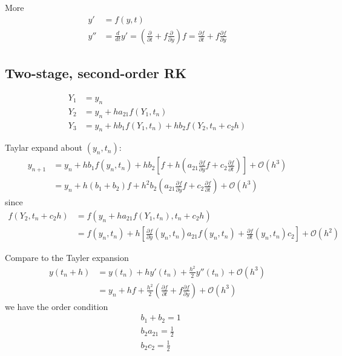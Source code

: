 \documentclass[prd,aps,a4paper,superscriptaddress,onecolumn,footinbib]{revtex4}
\begin{document}
More
\begin{align}
    y'
    &=f(y,t)
    \\
    y''
    &=\frac{d}{dt}y'
    =\left(\frac{\partial}{\partial t}+f\frac{\partial}{\partial y}\right)f
    =\frac{\partial f}{\partial t}+f\frac{\partial f}{\partial y}
\end{align}

\subsection{Two-stage, second-order RK}

\begin{align}
    Y_1&=y_n \\
    Y_2&=y_n+h a_{21}f(Y_1, t_n) \\
    Y_3&=y_n+h b_1f(Y_1, t_n)+h b_2f(Y_2, t_n+c_2h)
\end{align}

Taylar expand about $(y_n, t_n)$:
\begin{align}
    y_{n+1}
    &=y_n + h b_1 f(y_n, t_n) + h b_2
    \left[
        f + h
        \left(
            a_{21} \frac{\partial f}{\partial y} f + c_2\frac{\partial f}{\partial t}
        \right)
    \right]
    + \mathcal{O}(h^3)
    \\
    &=y_n + h(b_1+b_2)f + h^2 b_2
    \left(a_{21}\frac{\partial f}{\partial y}f + c_2\frac{\partial f}{\partial t}\right)
    + \mathcal{O}(h^3)
\end{align}
since
\begin{align}
    f(Y_2, t_n+c_2h)
    &=f(y_n+h a_{21}f(Y_1, t_n), t_n+c_2h) \\
    &=f(y_n, t_n) + h
    \left[
        \frac{\partial f}{\partial y}(y_n, t_n) a_{21}f(y_n, t_n)
        +\frac{\partial f}{\partial t}(y_n, t_n) c_2
    \right]
    + \mathcal{O}(h^2)
\end{align}

Compare to the Tayler expansion
\begin{align}
    y(t_n+h)
    &=y(t_n) + hy'(t_n) + \frac{h^2}{2}y''(t_n)
    + \mathcal{O}(h^3)
    \\
    &=y_n + h f + \frac{h^2}{2} \left(\frac{\partial f}{\partial t}+f\frac{\partial f}{\partial y}\right)
    + \mathcal{O}(h^3)
\end{align}
we have the order condition
\begin{align}
    &b_1+b_2 = 1 \\
    &b_2a_{21} = \frac{1}{2} \\
    &b_2c_2 = \frac{1}{2}
\end{align}
\end{document}
